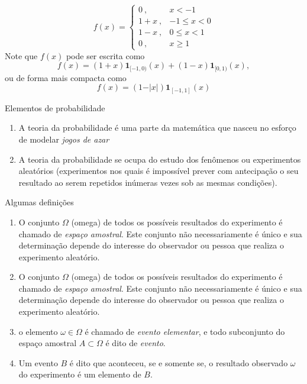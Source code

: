 \begin{frame}
\begin{exem}
$$f(x)= \begin{cases}
0 \ , & x <-1\\
1+x \ , & -1 \leq x < 0\\
1-x \ , & 0 \leq x < 1\\
0 \ , & x \geq 1
\end{cases} $$
Note que $f(x)$ pode ser escrita como 
$$
f(x)=(1+x)\mathbf{1}_{[-1,0)}(x)+(1-x)\mathbf{1}_{[0,1)}(x),
$$
ou de forma mais compacta como
$$f(x)=(1-\vert x\vert)\mathbf{1}_{[-1,1]}(x) $$
\end{exem}
\end{frame}
\begin{frame}{Elementos de probabilidade}
\begin{enumerate}
 \item A teoria da probabilidade é uma parte da matemática que nasceu no esforço de modelar {\it jogos de azar}
 \item A teoria da probabilidade se ocupa do estudo dos fenômenos ou experimentos aleatórios (experimentos nos quais é impossível prever com antecipação o seu resultado ao serem repetidos inúmeras vezes sob as mesmas condições).
 
\end{enumerate}
\begin{block}{Algumas definições}
\begin{enumerate}
 \item O conjunto $\Omega$ (omega) de todos os possíveis resultados do experimento é chamado de {\it espaço  amostral}. Este conjunto não necessariamente é único e sua determinação depende do interesse do observador ou pessoa que realiza o experimento aleatório.
 \item O conjunto $\Omega$ (omega) de todos os possíveis resultados do experimento é chamado de {\it espaço  amostral}.  Este conjunto não necessariamente é único e sua determinação depende do interesse do observador ou pessoa que realiza o experimento aleatório.
 \item  o elemento $\omega \in \Omega$ é chamado de
{\it evento elementar}, e todo subconjunto do espaço amostral  $A\subset\Omega$ é dito de  {\it evento}.
\item  Um evento $B$ é dito que aconteceu, se e somente se, o resultado observado $\omega$ do experimento é um elemento de $B.$
 \end{enumerate}
\end{block}
\end{frame}



